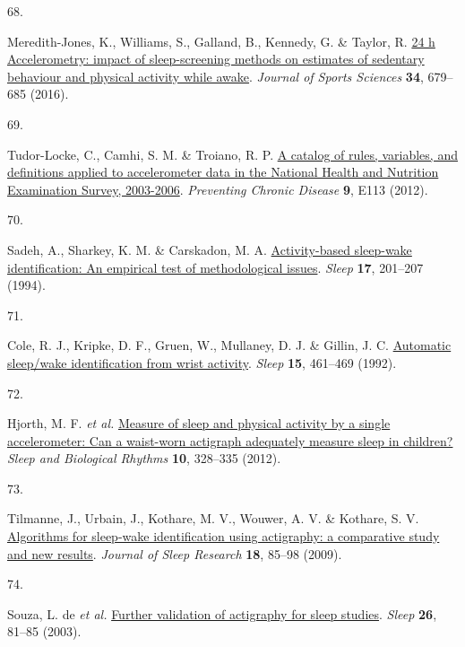 \documentclass[
  10pt,
]{scrbook}
\newlength{\cslhangindent}
\newlength{\csllabelwidth}
\newlength{\cslentryspacingunit} %
\newenvironment{CSLReferences}[2] %
 {%
  \setlength{\parindent}{0pt}
  \ifodd #1
  \let\oldpar\par
  \def\par{\hangindent=\cslhangindent\oldpar}
  \fi
  \setlength{\parskip}{#2\cslentryspacingunit}
 }%
 {}
\newcommand{\CSLLeftMargin}[1]{\parbox[t]{\csllabelwidth}{#1}}
\newcommand{\CSLRightInline}[1]{\parbox[t]{\linewidth - \csllabelwidth}{#1}\break}
\let\originaltextbf\textbf
\renewcommand{\textbf}[1]{\textcolor{color1}{\textsf{\originaltextbf{#1}}}}
\begin{document}
\begin{CSLReferences}{0}{0}
\leavevmode{}%
\CSLLeftMargin{68. }%
\CSLRightInline{Meredith-Jones, K., Williams, S., Galland, B., Kennedy,
G. \& Taylor, R. \href{https://doi.org/10.1080/02640414.2015.1068438}{24
h Accelerometry: impact of sleep-screening methods on estimates of
sedentary behaviour and physical activity while awake}. \emph{Journal of
Sports Sciences} \textbf{34}, 679--685 (2016).}

\leavevmode{}%
\CSLLeftMargin{69. }%
\CSLRightInline{Tudor-Locke, C., Camhi, S. M. \& Troiano, R. P.
\href{https://doi.org/10.5888/pcd9.110332}{A catalog of rules,
variables, and definitions applied to accelerometer data in the National
Health and Nutrition Examination Survey, 2003-2006}. \emph{Preventing
Chronic Disease} \textbf{9}, E113 (2012).}

\leavevmode{}%
\CSLLeftMargin{70. }%
\CSLRightInline{Sadeh, A., Sharkey, K. M. \& Carskadon, M. A.
\href{https://doi.org/10.1093/sleep/17.3.201}{Activity-based sleep-wake
identification: An empirical test of methodological issues}.
\emph{Sleep} \textbf{17}, 201--207 (1994).}

\leavevmode{}%
\CSLLeftMargin{71. }%
\CSLRightInline{Cole, R. J., Kripke, D. F., Gruen, W., Mullaney, D. J.
\& Gillin, J. C. \href{https://doi.org/10.1093/sleep/15.5.461}{Automatic
sleep/wake identification from wrist activity}. \emph{Sleep}
\textbf{15}, 461--469 (1992).}

\leavevmode{}%
\CSLLeftMargin{72. }%
\CSLRightInline{Hjorth, M. F. \emph{et al.}
\href{https://doi.org/10.1111/j.1479-8425.2012.00578.x}{Measure of sleep
and physical activity by a single accelerometer: Can a waist-worn
actigraph adequately measure sleep in children?} \emph{Sleep and
Biological Rhythms} \textbf{10}, 328--335 (2012).}

\leavevmode{}%
\CSLLeftMargin{73. }%
\CSLRightInline{Tilmanne, J., Urbain, J., Kothare, M. V., Wouwer, A. V.
\& Kothare, S. V.
\href{https://doi.org/10.1111/j.1365-2869.2008.00706.x}{Algorithms for
sleep-wake identification using actigraphy: a comparative study and new
results}. \emph{Journal of Sleep Research} \textbf{18}, 85--98 (2009).}

\leavevmode{}%
\CSLLeftMargin{74. }%
\CSLRightInline{Souza, L. de \emph{et al.}
\href{https://doi.org/10.1093/sleep/26.1.81}{Further validation of
actigraphy for sleep studies}. \emph{Sleep} \textbf{26}, 81--85 (2003).}


\end{CSLReferences}
\end{document}
